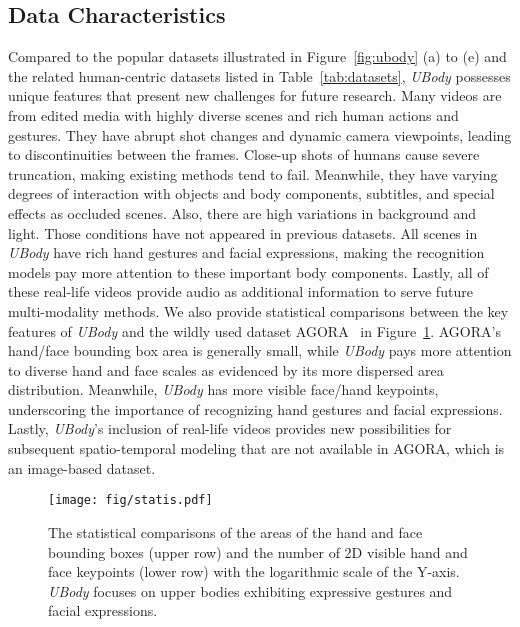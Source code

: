 \documentclass[10pt,twocolumn,letterpaper]{article}
\newcommand{\dataname}{\emph{UBody}\xspace}
\begin{document}
\subsection{Data Characteristics}
\label{sec:ubody_feature}

Compared to the popular datasets illustrated in Figure~\ref{fig:ubody} (a) to (e) and the related human-centric datasets listed in Table~\ref{tab:datasets}, \dataname possesses unique features that present new challenges for future research.
Many videos are from edited media with highly diverse scenes and rich human actions and gestures. They have abrupt shot changes and dynamic camera viewpoints, leading to discontinuities between the frames. Close-up shots of humans cause severe truncation, making existing methods tend to fail. Meanwhile, they have varying degrees of interaction with objects and body components, subtitles, and special effects as occluded scenes. Also, there are high variations in background and light. Those conditions have not appeared in previous datasets.
All scenes in \dataname have rich hand gestures and facial expressions, making the recognition models pay more attention to these important body components. Lastly, all of these real-life videos provide audio as additional information to serve future multi-modality methods.
We also provide statistical comparisons between the key features of \dataname and the wildly used dataset AGORA~\cite{Patel_2021agora} in Figure~\ref{fig:statis}.
AGORA's hand/face bounding box area is generally small, while \dataname pays more attention to diverse hand and face scales as evidenced by its more dispersed area distribution. Meanwhile, \dataname has more visible face/hand keypoints, underscoring the importance of recognizing hand gestures and facial expressions. Lastly, \dataname's inclusion of  real-life videos provides new possibilities for subsequent spatio-temporal modeling that are not available in AGORA, which is an image-based dataset.


\vspace{-0.3cm}
\begin{figure}[t]
\begin{center}
\texttt{[image: fig/statis.pdf]}
\end{center}
\vspace{-0.6cm}
\caption{The statistical comparisons of the areas of the hand and face bounding boxes (upper row) and the number of 2D visible hand and face keypoints (lower row) with the logarithmic scale of the Y-axis. \dataname focuses on upper bodies exhibiting expressive gestures and facial expressions. 
}
\label{fig:statis}
\vspace{-0.6cm}
\end{figure}
\end{document}
